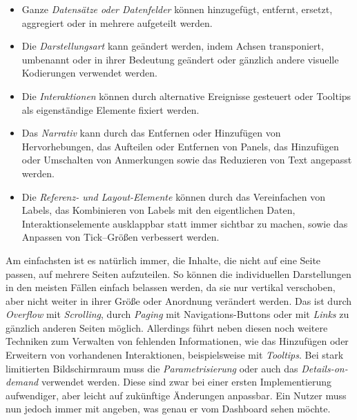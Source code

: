 \begin{itemize}
    \item Ganze \emph{Datensätze oder Datenfelder} können hinzugefügt, entfernt, ersetzt, aggregiert oder in mehrere aufgeteilt werden.
    \item Die \emph{Darstellungsart} kann geändert werden, indem Achsen transponiert, umbenannt oder in ihrer Bedeutung geändert oder gänzlich andere visuelle Kodierungen verwendet werden.
    \item Die \emph{Interaktionen} können durch alternative Ereignisse gesteuert oder Tooltips als eigenständige Elemente fixiert werden.
    \item Das \emph{Narrativ} kann durch das Entfernen oder Hinzufügen von Hervorhebungen, das Aufteilen oder Entfernen von Panels, das Hinzufügen oder Umschalten von Anmerkungen sowie das Reduzieren von Text angepasst werden.
    \item Die \emph{Referenz- und Layout-Elemente} können durch das Vereinfachen von Labels, das Kombinieren von Labels mit den eigentlichen Daten, Interaktionselemente ausklappbar statt immer sichtbar zu machen, sowie das Anpassen von Tick--Größen verbessert werden.
\end{itemize}

Am einfachsten ist es natürlich immer, die Inhalte, die nicht auf eine Seite passen, auf mehrere Seiten aufzuteilen.
So können die individuellen Darstellungen in den meisten Fällen einfach belassen werden, da sie nur vertikal verschoben, aber nicht weiter in ihrer Größe oder Anordnung verändert werden.
Das ist durch \emph{Overflow} mit \emph{Scrolling}, durch \emph{Paging} mit Navigations-Buttons oder mit \emph{Links} zu gänzlich anderen Seiten möglich.
Allerdings führt \autocite[S. 6--7]{Bach.DashboardDesignPatterns.2023} neben diesen noch weitere Techniken zum Verwalten von fehlenden Informationen, wie das Hinzufügen oder Erweitern von vorhandenen Interaktionen, beispielsweise mit \emph{Tooltips}.
Bei stark limitierten Bildschirmraum muss die \emph{Parametrisierung} oder auch das \emph{Details-on-demand} verwendet werden.
Diese sind zwar bei einer ersten Implementierung aufwendiger, aber leicht auf zukünftige Änderungen anpassbar.
Ein Nutzer muss nun jedoch immer mit angeben, was genau er vom Dashboard sehen möchte.

